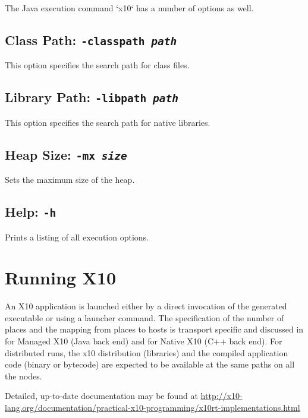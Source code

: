 The Java execution command \xcd`x10` has a number of options as well. 

\subsection{Class Path: {\tt -classpath {\em path}}}

This option specifies the search path for class files. 

\subsection{Library Path: {\tt -libpath {\em path}}}

This option specifies the search path for native libraries.

\subsection{Heap Size: {\tt -mx {\em size}}}

Sets the maximum size of the heap. 

\subsection{Help: {\tt -h}}

Prints a listing of all execution options.





\section{Running X10}

An X10 application is launched either by a direct invocation of the generated
executable or using a launcher command. The specification of the number of
places and the mapping from places to hosts is transport specific and
discussed in  for Managed X10 (Java back end) and
 for Native X10 (C++ back end). For distributed runs,
the x10 distribution (libraries) and the compiled application code (binary or
bytecode) are expected to be available at the same paths on all the nodes.  

Detailed, up-to-date documentation may be found at
\url{http://x10-lang.org/documentation/practical-x10-programming/x10rt-implementations.html}


